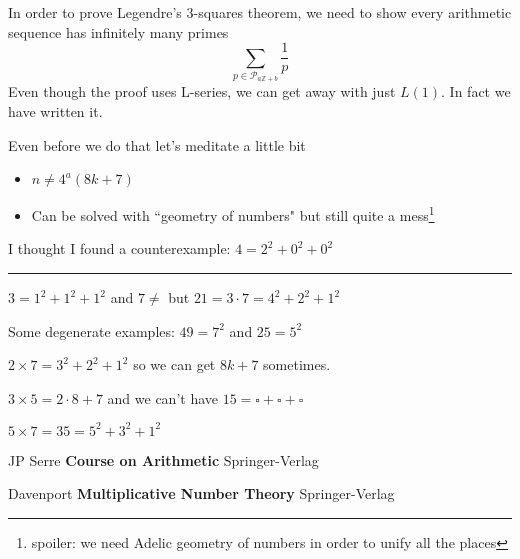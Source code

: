 \documentclass[12pt]{article}
\begin{document}
\noindent In order to prove Legendre's 3-squares theorem, we need to show every arithmetic sequence has infinitely many primes
$$ \sum_{p \in \mathcal{P}_{a\mathbb{Z}+b}} \frac{1}{p}$$
Even though the proof uses L-series, we can get away with just $L(1)$.  In fact we have written it.

\newpage

\noindent Even before we do that let's meditate a little bit
\begin{itemize}
\item $ n \neq 4^a(8k+7)$
\item Can be solved with ``geometry of numbers" but still quite a mess\footnote{spoiler: we need Adelic geometry of numbers in order to unify all the places}
\end{itemize}
I thought I found a counterexample:
$ 4 = 2^2 + 0^2 + 0^2 $
\hrule \vspace{6pt}
$3 = 1^2 + 1^2 + 1^2 $ and $7 \neq $ but $21 = 3 \cdot 7 = 4^2 + 2^2 + 1^2$ \newline 

Some degenerate examples: $49 = 7^2$ and $25 = 5^2$ \newline

$2 \times 7 = 3^2 + 2^2 + 1^2 $ so we can get $8k+7$ sometimes. \newline

$3 \times 5 = 2 \cdot 8 + 7$ and we can't have $15 = \square + \square + \square$ \newline

$ 5 \times 7 = 35 = 5^2 + 3^2 + 1^2 $

\newpage


\selectfont \fontsize{12}{10}\selectfont

\begin{thebibliography}{}

\item JP Serre \textbf{Course on Arithmetic} Springer-Verlag

\item Davenport \textbf{Multiplicative Number Theory} Springer-Verlag



\end{thebibliography}
\end{document}
